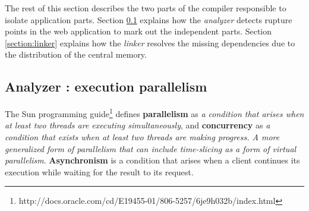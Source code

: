 The rest of this section describes the two parts of the compiler responsible to isolate application parts.
Section \ref{section:analyzer} explains how the \textit{analyzer} detects rupture points in the web application to mark out the independent parts.
Section \ref{section:linker} explains how the \textit{linker} resolves the missing dependencies due to the distribution of the central memory.



\subsection{Analyzer : execution parallelism} \label{section:analyzer}

The Sun programming guide\footnote{\raggedright http://docs.oracle.com/cd/E19455-01/806-5257/6je9h032b/index.html} defines \textbf{parallelism} as \textit{a condition that arises when at least two threads are executing simultaneously}, and \textbf{concurrency} as \textit{a condition that exists when at least two threads are making progress. A more generalized form of parallelism that can include time-slicing as a form of virtual parallelism}.
\textbf{Asynchronism} is a condition that arises when a client continues its execution while waiting for the result to its request.


